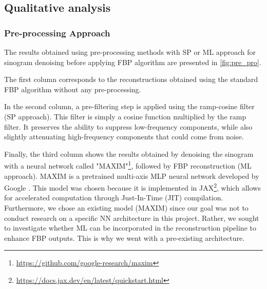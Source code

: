 \documentclass{article}
\begin{document}
\subsection{Qualitative analysis}

\subsubsection*{Pre-processing Approach}
The results obtained using pre-processing methods with SP or ML approach for sinogram denoising before applying FBP algorithm are presented in \ref{fig:pre_pro}.

The first column corresponds to the reconstructions obtained using the standard FBP algorithm without any pre-processing.


In the second column, a pre-filtering step is applied using the ramp-cosine filter (SP approach). This filter is simply a cosine function multiplied by the ramp filter. It preserves the ability to suppress low-frequency components, while also slightly attenuating high-frequency components that could come from noise.

Finally, the third column shows the results obtained by denoising the sinogram with a neural network called "MAXIM"\footnote{\url{https://github.com/google-research/maxim}}, followed by FBP reconstruction (ML approach). MAXIM is a pretrained multi-axis MLP neural network developed by Google \cite{tu_maxim_2022}. This model was chosen because it is implemented in JAX\footnote{\url{https://docs.jax.dev/en/latest/quickstart.html}}, which allows for accelerated computation through Just-In-Time (JIT) compilation. Furthermore, we chose an existing model (MAXIM) since our goal was not to conduct research on a specific NN architecture in this project.
Rather, we sought to investigate whether ML can be incorporated in the reconstruction pipeline to enhance FBP outputs. This is why we went with a pre-existing architecture.
\end{document}
